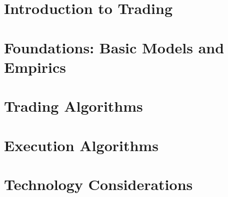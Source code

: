\documentclass[krantz1]{style/krantz} %
\begin{document}
\raggedbottom

\frontmatter
\setcounter{page}{0}



\cleardoublepage
\tableofcontents



\mainmatter

\part{Introduction to Trading\label{part:one}}



\part{Foundations: Basic Models and Empirics\label{part:two}}





\part{Trading Algorithms\label{part:three}}





\part{Execution Algorithms\label{part:four}}





\part{Technology Considerations\label{part:five}}



%
%




\end{document}
